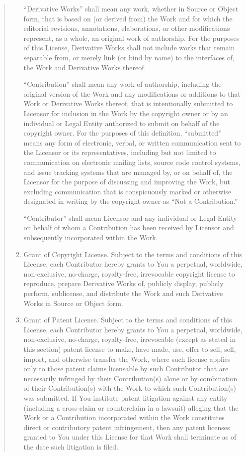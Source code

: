 \documentclass[letterpaper,10pt,english]{sphinxmanual}
\begin{document}
\begin{quote}
\begin{enumerate}
“Derivative Works” shall mean any work, whether in Source or Object
form, that is based on (or derived from) the Work and for which the
editorial revisions, annotations, elaborations, or other modifications
represent, as a whole, an original work of authorship. For the purposes
of this License, Derivative Works shall not include works that remain
separable from, or merely link (or bind by name) to the interfaces of,
the Work and Derivative Works thereof.

“Contribution” shall mean any work of authorship, including
the original version of the Work and any modifications or additions
to that Work or Derivative Works thereof, that is intentionally
submitted to Licensor for inclusion in the Work by the copyright owner
or by an individual or Legal Entity authorized to submit on behalf of
the copyright owner. For the purposes of this definition, “submitted”
means any form of electronic, verbal, or written communication sent
to the Licensor or its representatives, including but not limited to
communication on electronic mailing lists, source code control systems,
and issue tracking systems that are managed by, or on behalf of, the
Licensor for the purpose of discussing and improving the Work, but
excluding communication that is conspicuously marked or otherwise
designated in writing by the copyright owner as “Not a Contribution.”

“Contributor” shall mean Licensor and any individual or Legal Entity
on behalf of whom a Contribution has been received by Licensor and
subsequently incorporated within the Work.

\item {} 
Grant of Copyright License. Subject to the terms and conditions of
this License, each Contributor hereby grants to You a perpetual,
worldwide, non-exclusive, no-charge, royalty-free, irrevocable
copyright license to reproduce, prepare Derivative Works of,
publicly display, publicly perform, sublicense, and distribute the
Work and such Derivative Works in Source or Object form.

\item {} 
Grant of Patent License. Subject to the terms and conditions of
this License, each Contributor hereby grants to You a perpetual,
worldwide, non-exclusive, no-charge, royalty-free, irrevocable
(except as stated in this section) patent license to make, have made,
use, offer to sell, sell, import, and otherwise transfer the Work,
where such license applies only to those patent claims licensable
by such Contributor that are necessarily infringed by their
Contribution(s) alone or by combination of their Contribution(s)
with the Work to which such Contribution(s) was submitted. If You
institute patent litigation against any entity (including a
cross-claim or counterclaim in a lawsuit) alleging that the Work
or a Contribution incorporated within the Work constitutes direct
or contributory patent infringement, then any patent licenses
granted to You under this License for that Work shall terminate
as of the date such litigation is filed.


\end{enumerate}
\end{quote}
\end{document}
